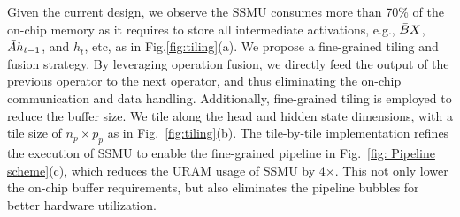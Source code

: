 Given the current design, we observe the SSMU consumes more than 70\% of the on-chip memory as it requires to store all intermediate activations, 
e.g., $\Bar{B}X$, $\Bar{A}{h_{t-1}}$, and $h_t$, etc, as in Fig.\ref{fig:tiling}(a).
We propose a fine-grained tiling and fusion strategy. 
By leveraging operation fusion, we directly feed the output of the previous operator to the next operator,
and thus eliminating the on-chip communication and data handling.
Additionally, fine-grained tiling is employed to reduce the buffer size.
We tile along the head and hidden state dimensions, with a tile size of $n_p \times p_p$ as in Fig.~\ref{fig:tiling}(b).
The tile-by-tile implementation refines the execution of SSMU to enable the fine-grained pipeline in Fig.~\ref{fig: Pipeline scheme}(c), 
which reduces the URAM usage of SSMU by 4$\times$. 
This not only lower the on-chip buffer requirements, but also eliminates the pipeline bubbles for better hardware utilization.


